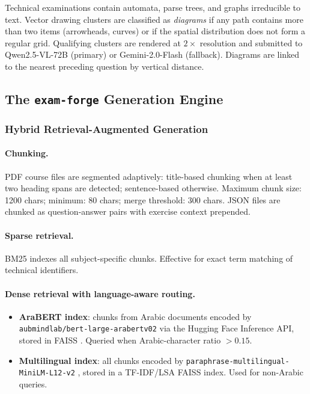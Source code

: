 \documentclass[12pt, a4paper]{article}
\begin{document}
Technical examinations contain automata, parse trees, and graphs irreducible to text.
Vector drawing clusters are classified as \textit{diagrams} if any path contains more
than two items (arrowheads, curves) or if the spatial distribution does not form a
regular grid. Qualifying clusters are rendered at $2\times$ resolution and submitted
to Qwen2.5-VL-72B \cite{qwen2025vl} (primary) or Gemini-2.0-Flash
\cite{google2024gemini} (fallback). Diagrams are linked to the nearest preceding
question by vertical distance.

\subsection{The \texttt{exam-forge} Generation Engine}
\label{subsec:examforge}

\subsubsection{Hybrid Retrieval-Augmented Generation}
\label{subsec:rag}

\paragraph{Chunking.}
PDF course files are segmented adaptively: title-based chunking when at least two
heading spans are detected; sentence-based otherwise. Maximum chunk size: 1200 chars;
minimum: 80 chars; merge threshold: 300 chars. JSON files are chunked as
question-answer pairs with exercise context prepended.

\paragraph{Sparse retrieval.}
BM25 \cite{robertson2009bm25} indexes all subject-specific chunks.
Effective for exact term matching of technical identifiers.

\paragraph{Dense retrieval with language-aware routing.}
\begin{itemize}[leftmargin=2em]
  \item \textbf{AraBERT index}: chunks from Arabic documents encoded by
  \texttt{aubmindlab/bert-large-arabertv02} \cite{antoun2020arabert} via the
  Hugging Face Inference API, stored in FAISS \cite{faiss2019}.
  Queried when Arabic-character ratio $> 0.15$.
  \item \textbf{Multilingual index}: all chunks encoded by
  \texttt{paraphrase-multilingual-MiniLM-L12-v2} \cite{reimers2019sentence},
  stored in a TF-IDF/LSA FAISS index. Used for non-Arabic queries.
\end{itemize}
\end{document}
